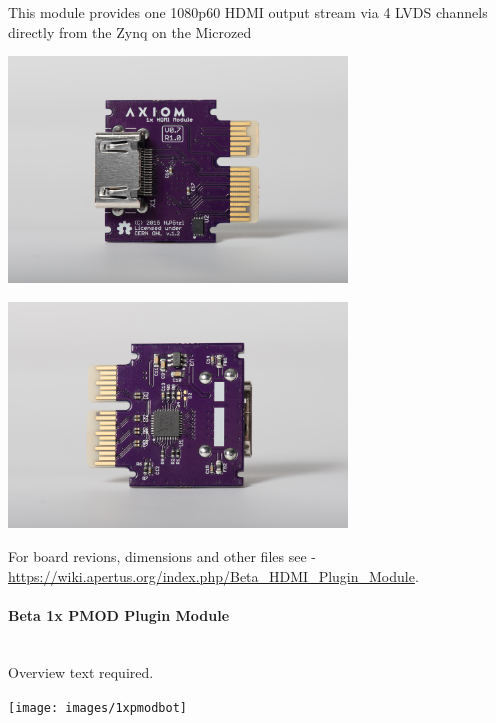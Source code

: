This module provides one 1080p60 HDMI output stream via 4 LVDS channels directly from the Zynq on the Microzed 

\begin{center}
\includegraphics[height=6cm]{images/Axiom_Beta_Plugin_Module_1x_HDMI_v0.4_TOP}
\end{center}

\begin{center}
\includegraphics[height=6cm]{images/Axiom_Beta_Plugin_Module_1x_HDMI_v0.4_BOT}
\end{center}

For board revions, dimensions and other files see - \href{https://wiki.apertus.org/index.php/Beta_HDMI_Plugin_Module}{https://wiki.apertus.org/index.php/Beta_HDMI_Plugin_Module}.\\


\paragraph{Beta 1x PMOD Plugin Module }\\

Overview text required.\\

\begin{center}
\texttt{[image: images/1xpmodbot]}
\end{center}


